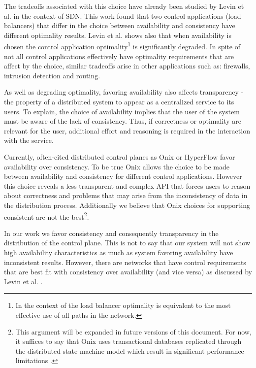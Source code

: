 The tradeoffs associated with this choice have already been studied by Levin et al. \cite{Levin:2012bt} in the context of SDN. This work found that two control applications (load balancers)  that differ in the choice between availability and consistency have different optimality results. Levin et al. shows also that when availability is chosen the control application optimality\footnote{In the context of the load balancer optimality is equivalent to the most effective use of all paths in the network.} is significantly degraded. In spite of  not all control applications effectively have optimality requirements that are affect by the choice, similar tradeoffs arise in other applications such as: firewalls, intrusion detection and routing. 

As well as degrading optimality, favoring availability also affects transparency - the property of a distributed system to appear as a centralized service to its users. To explain, the choice of availability implies that the user of the system must be aware of the lack of consistency. Thus, if correctness or optimality are relevant for the user, additional effort and reasoning is required in the interaction with the service. 

Currently, often-cited distributed control planes as Onix \cite{Koponen:2010th} or HyperFlow  \cite{Tootoonchian:2010vy} favor availability over consistency. To be true Onix allows the choice to be made between availability and consistency for different control applications. However this choice reveals a less transparent and complex API that forces users to reason about correctness and problems that may arise from the inconsistency of data in the distribution process. Additionally we believe that Onix choices for supporting consistent are not the best\footnote{This argument will be expanded in future versions of this document. For now, it suffices to say that Onix uses transactional databases replicated through the distributed state machine model which result in significant performance limitations \cite{Koponen:2010th}.}.

In our work we favor consistency and consequently transparency in the distribution of the control plane. This is not to say that our system will not show high availability characteristics as much as system favoring availability have inconsistent results. However, there are networks that have control requirements that are best fit with consistency over availability (and vice versa) as discussed by Levin et al. \cite{Levin:2012bt}. 

